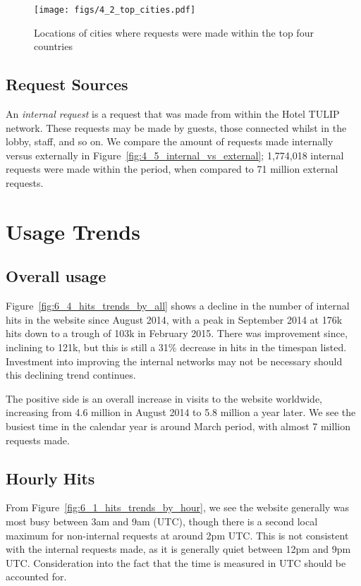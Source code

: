 \documentclass[12pt,titlepage]{article}
\begin{document}
\begin{figure}[p]
  \hspace{-0.125\textwidth}
  \texttt{[image: figs/4\_2\_top\_cities.pdf]}
  \caption{Locations of cities where requests were made within the top four countries}
  \label{fig:top_cities}
\end{figure}

\subsection{Request Sources}

An \textit{internal request} is a request that was made from within the Hotel TULIP network. These requests may be made by guests, those connected whilst in the lobby, staff, and so on. We compare the amount of requests made internally versus externally in Figure~\ref{fig:4_5_internal_vs_external}; 1,774,018 internal requests were made within the period, when compared to 71 million external requests.

\newpage
\section{Usage Trends}
\label{ssub:trends}
\subsection{Overall usage}

Figure~\ref{fig:6_4_hits_trends_by_all} shows a decline in the number of internal hits in the website since August 2014, with a peak in September 2014 at 176k hits down to a trough of 103k in February 2015. There was improvement since, inclining to 121k, but this is still a 31\% decrease in hits in the timespan listed. Investment into improving the internal networks may not be necessary should this declining trend continues.

The positive side is an overall increase in visits to the website worldwide, increasing from 4.6 million in August 2014 to 5.8 million a year later. We see the busiest time in the calendar year is around March period, with almost 7 million requests made.

\subsection{Hourly Hits}

From Figure~\ref{fig:6_1_hits_trends_by_hour}, we see the website generally was most busy between 3am and 9am (UTC), though there is a second local maximum for non-internal requests at around 2pm UTC. This is not consistent with the internal requests made, as it is generally quiet between 12pm and 9pm UTC. Consideration into the fact that the time is measured in UTC should be accounted for. 
\end{document}

